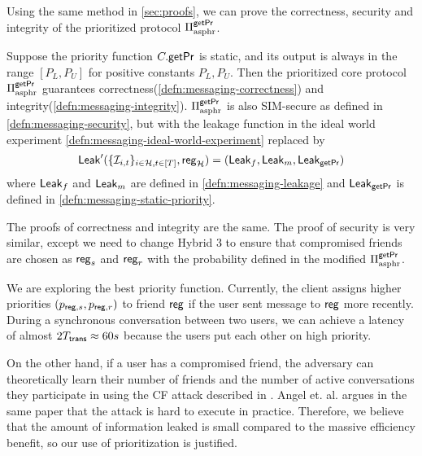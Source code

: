 Using the same method in \cref{sec:proofs}, we can prove the correctness, security and integrity of the prioritized protocol $\Pi^{\mathsf{getPr}}_{\text{asphr}}$.
\begin{theorem}
Suppose the priority function $C.\mathsf{getPr}$ is static, and its output is always in the range $[P_L, P_U]$ for positive constants $P_L, P_U$. Then the prioritized core protocol $\Pi^{\mathsf{getPr}}_{\text{asphr}}$ guarantees correctness(\cref{defn:messaging-correctness}) and integrity(\cref{defn:messaging-integrity}). $\Pi^{\mathsf{getPr}}_{\text{asphr}}$ is also SIM-secure as defined in \cref{defn:messaging-security}, but with the leakage function in the ideal world experiment \cref{defn:messaging-ideal-world-experiment} replaced by
$$\mathsf{Leak}'(\{\mathcal{I}_{i, t}\}_{i \in \mathcal{H}, t \in [T]}, \mathsf{reg}_{\mathcal{H}}) = (\mathsf{Leak}_f, \mathsf{Leak}_m, \mathsf{Leak}_{\mathsf{getPr}})$$
where $\mathsf{Leak}_f$ and $\mathsf{Leak}_m$ are defined in \cref{defn:messaging-leakage} and $\mathsf{Leak}_{\mathsf{getPr}}$ is defined in \cref{defn:messaging-static-priority}.
\end{theorem}

The proofs of correctness and integrity are the same. The proof of security is very similar, except we need to change Hybrid 3 to ensure that compromised friends are chosen as $\mathsf{reg}_s$ and $\mathsf{reg}_r$ with the probability defined in the modified $\Pi^{\mathsf{getPr}}_{\text{asphr}}$.

We are exploring the best priority function. Currently, the client assigns higher priorities $(p_{\mathsf{reg}, s}, p_{\mathsf{reg}, r})$ to friend $\mathsf{reg}$ if the user sent message to $\mathsf{reg}$ more recently. During a synchronous conversation between two users, we can achieve a latency of almost $2T_{\mathsf{trans}} \approx 60s$ because the users put each other on high priority. 

On the other hand, if a user has a compromised friend, the adversary can theoretically learn their number of friends and the number of active conversations they participate in using the CF attack described in \cite{angel2018cf}. Angel et. al. argues in the same paper that the attack is hard to execute in practice. Therefore, we believe that the amount of information leaked is small compared to the massive efficiency benefit, so our use of prioritization is justified.

